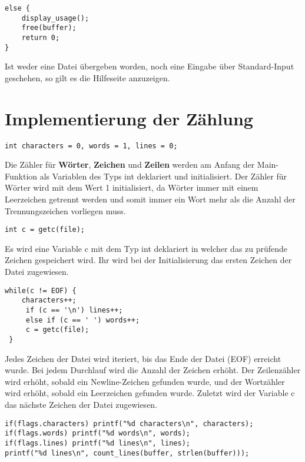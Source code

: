 \documentclass[10pt,a4paper]{article}
\begin{document}
\begin{spacing}{1}
\begin{lstlisting}[style=CStyle]
else {
	display_usage();
	free(buffer);
	return 0;
}
\end{lstlisting}

Ist weder eine Datei übergeben worden, noch eine Eingabe über Standard-Input geschehen, so gilt es die Hilfeseite anzuzeigen.
\section{Implementierung der Zählung}
\label{Implementierung der Zählung}

\begin{lstlisting}[style=CStyle]
int characters = 0, words = 1, lines = 0;
\end{lstlisting}

Die Zähler für \textbf{Wörter}, \textbf{Zeichen} und \textbf{Zeilen} werden am Anfang der Main-Funktion als Variablen des Typs int deklariert und initialisiert.
Der Zähler für Wörter wird mit dem Wert 1 initialisiert, da Wörter immer mit einem Leerzeichen getrennt werden und somit immer ein Wort mehr als die Anzahl der Trennungszeichen vorliegen muss.

\begin{lstlisting}[style=CStyle]
int c = getc(file);
\end{lstlisting}

Es wird eine Variable c mit dem Typ int deklariert in welcher das zu prüfende Zeichen gespeichert wird. Ihr wird bei der Initialisierung das ersten Zeichen der Datei zugewiesen.

\begin{lstlisting}[style=CStyle]
while(c != EOF) {
    characters++;
     if (c == '\n') lines++;
     else if (c == ' ') words++;
     c = getc(file);
 }
\end{lstlisting}

Jedes Zeichen der Datei wird iteriert, bis das Ende der Datei (EOF) erreicht wurde. Bei jedem Durchlauf wird die Anzahl der Zeichen erhöht. Der Zeilenzähler wird erhöht, sobald ein Newline-Zeichen gefunden wurde, und der Wortzähler wird erhöht, sobald ein Leerzeichen gefunden wurde. Zuletzt wird der Variable c das nächste Zeichen der Datei zugewiesen.

\begin{lstlisting}[style=CStyle]
if(flags.characters) printf("%d characters\n", characters);
if(flags.words) printf("%d words\n", words);
if(flags.lines) printf("%d lines\n", lines);
printf("%d lines\n", count_lines(buffer, strlen(buffer)));
\end{lstlisting}


\end{spacing}
\end{document}
